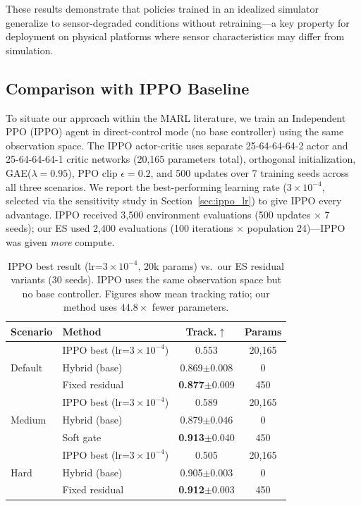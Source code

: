 \documentclass[journal]{IEEEtran}
\begin{document}
These results demonstrate that policies trained in an idealized simulator generalize
to sensor-degraded conditions without retraining---a key property for deployment on
physical platforms where sensor characteristics may differ from simulation.

\subsection{Comparison with IPPO Baseline}
\label{sec:ippo}

To situate our approach within the MARL literature, we train an Independent PPO
(IPPO) agent \cite{mappo} in direct-control mode (no base controller) using the same
observation space. The IPPO actor-critic uses separate 25-64-64-64-2 actor and
25-64-64-64-1 critic networks (20,165 parameters total), orthogonal initialization,
GAE($\lambda=0.95$), PPO clip $\epsilon=0.2$, and 500 updates over 7 training seeds
across all three scenarios. We report the best-performing learning rate ($3\times10^{-4}$,
selected via the sensitivity study in Section~\ref{sec:ippo_lr}) to give IPPO every
advantage. IPPO received 3,500 environment evaluations (500 updates $\times$ 7 seeds);
our ES used 2,400 evaluations (100 iterations $\times$ population 24)---IPPO was given
\emph{more} compute.

\begin{table}[t]
\centering
\caption{IPPO best result (lr=$3\times10^{-4}$, 20k params) vs.\ our ES residual
variants (30 seeds). IPPO uses the same observation space but no base controller.
Figures show mean tracking ratio; our method uses $44.8\times$ fewer parameters.}
\label{tab:ippo}
\scriptsize
\setlength{\tabcolsep}{4pt}
\begin{tabular}{@{}llcc@{}}
\toprule
Scenario & Method & Track.$\uparrow$ & Params \\
\midrule
\multirow{3}{*}{Default}
  & IPPO best (lr=$3\times10^{-4}$) & 0.553 & 20,165 \\
  & Hybrid (base)                   & 0.869$\pm$0.008 & 0 \\
  & Fixed residual                  & \textbf{0.877}$\pm$0.009 & 450 \\
\midrule
\multirow{3}{*}{Medium}
  & IPPO best (lr=$3\times10^{-4}$) & 0.589 & 20,165 \\
  & Hybrid (base)                   & 0.879$\pm$0.046 & 0 \\
  & Soft gate                       & \textbf{0.913}$\pm$0.040 & 450 \\
\midrule
\multirow{3}{*}{Hard}
  & IPPO best (lr=$3\times10^{-4}$) & 0.505 & 20,165 \\
  & Hybrid (base)                   & 0.905$\pm$0.003 & 0 \\
  & Fixed residual                  & \textbf{0.912}$\pm$0.003 & 450 \\
\bottomrule
\end{tabular}
\end{table}
\end{document}
